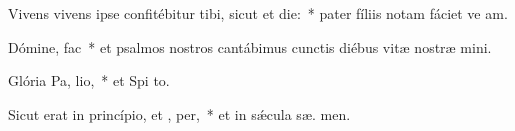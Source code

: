 \item Vivens vivens ipse confitébitur tibi, sicut et  die:~* pater fíliis notam fáciet ve am.
\item Dómine,   fac~* et psalmos nostros cantábimus cunctis diébus vitæ nostræ   mini.
\item Glória Pa,  lio,~* et Spi to.
\item Sicut erat in princípio, et ,  per,~* et in sǽcula sæ. men.
